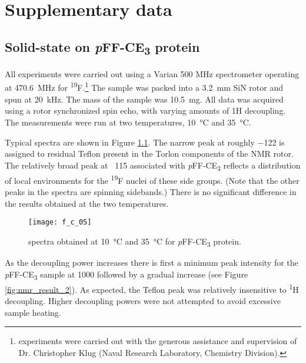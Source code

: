 \chapter{Supplementary data}

\section{Solid-state  on \emph{p}FF-CE\textsubscript{3} protein}

All experiments were carried out using a Varian 500 MHz spectrometer operating
at \SI{470.6}{\mega\hertz} for \textsuperscript{19}F.\footnote{
experiments were carried out with the generous assistance and supervision of Dr.
Christopher Klug (Naval Research Laboratory, Chemistry Division).}
The sample was packed into a \SI{3.2}{\mm} SiN rotor and spun at
\SI{20}{\kilo\hertz}.  The mass of the sample was \SI{10.5}{\mg}.  All data was
acquired using a rotor synchronized spin echo, with varying amounts of 1H
decoupling. The measurements were run at two temperatures, \SI{10}{\celsius} and
\SI{35}{\celsius}.

Typical spectra are shown in Figure \ref{fig:nmr_result_1}.  The narrow peak at
roughly \SI{-122}{\ppm} is assigned to residual Teflon present in the Torlon
components of the NMR rotor.  The relatively broad peak at ~\SI{115}{\ppm}
associated with \emph{p}FF-CE\textsubscript{3} reflects a distribution of local
environments for the \textsuperscript{19}F nuclei of these side groups.  (Note
that the other peaks in the spectra are spinning sidebands.) There is no
significant difference in the results obtained at the two temperatures.
\begin{figure}[h!] \centering \texttt{[image: f\_c\_05]}
    \caption{ spectra obtained at \SI{10}{\celsius} and
    \SI{35}{\celsius} for \emph{p}FF-CE\textsubscript{3} protein.}
    \label{fig:nmr_result_1} \end{figure}

As the decoupling power increases there is first a minimum peak intensity for
the \emph{p}FF-CE\textsubscript{3} sample at 1000 followed by a gradual
increase (see Figure \ref{fig:nmr_result_2}).  As expected, the Teflon peak was
relatively insensitive to \textsuperscript{1}H decoupling.  Higher decoupling
powers were not attempted to avoid excessive sample heating.

